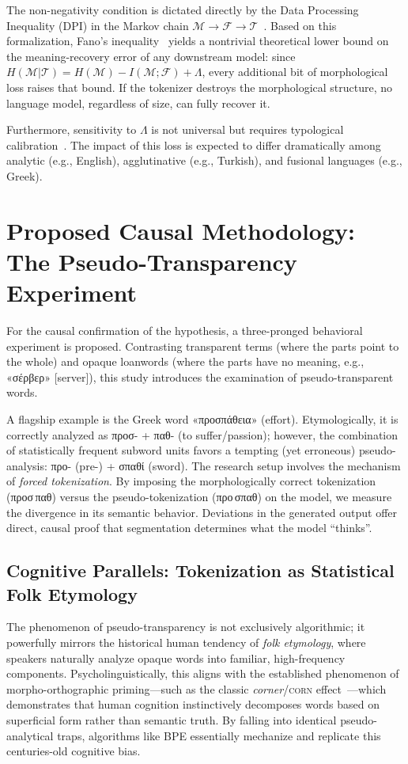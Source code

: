 \documentclass[11pt,a4paper]{article}
\begin{document}
The non-negativity condition is dictated directly by the Data Processing Inequality (DPI) in the Markov chain $\mathcal{M} \to \mathcal{F} \to \mathcal{T}$~\cite{cover2006}. Based on this formalization, Fano's inequality~\cite{cover2006} yields a nontrivial theoretical lower bound on the meaning-recovery error of any downstream model: since $H(\mathcal{M}|\mathcal{T}) = H(\mathcal{M}) - I(\mathcal{M}; \mathcal{F}) + \Lambda$, every additional bit of morphological loss raises that bound. If the tokenizer destroys the morphological structure, no language model, regardless of size, can fully recover it.

Furthermore, sensitivity to $\Lambda$ is not universal but requires typological calibration~\cite{rust2021}. The impact of this loss is expected to differ dramatically among analytic (e.g., English), agglutinative (e.g., Turkish), and fusional languages (e.g., Greek).

\section{Proposed Causal Methodology: The Pseudo-Transparency Experiment}

For the causal confirmation of the hypothesis, a three-pronged behavioral experiment is proposed. Contrasting transparent terms (where the parts point to the whole) and opaque loanwords (where the parts have no meaning, e.g., «σέρβερ» [server]), this study introduces the examination of pseudo-transparent words.

A flagship example is the Greek word «προσπάθεια» (effort). Etymologically, it is correctly analyzed as προσ- + παθ- (to suffer/passion); however, the combination of statistically frequent subword units favors a tempting (yet erroneous) pseudo-analysis: προ- (pre-) + σπαθί (sword). The research setup involves the mechanism of \emph{forced tokenization}. By imposing the morphologically correct tokenization (προσ\,παθ) versus the pseudo-tokenization (προ\,σπαθ) on the model, we measure the divergence in its semantic behavior. Deviations in the generated output offer direct, causal proof that segmentation determines what the model ``thinks''.

\subsection{Cognitive Parallels: Tokenization as Statistical Folk Etymology}

The phenomenon of pseudo-transparency is not exclusively algorithmic; it powerfully mirrors the historical human tendency of \emph{folk etymology}, where speakers naturally analyze opaque words into familiar, high-frequency components. Psycholinguistically, this aligns with the established phenomenon of morpho-orthographic priming---such as the classic \emph{corner}/\textsc{corn} effect~\cite{rastle2004}---which demonstrates that human cognition instinctively decomposes words based on superficial form rather than semantic truth. By falling into identical pseudo-analytical traps, algorithms like BPE essentially mechanize and replicate this centuries-old cognitive bias.
\end{document}
